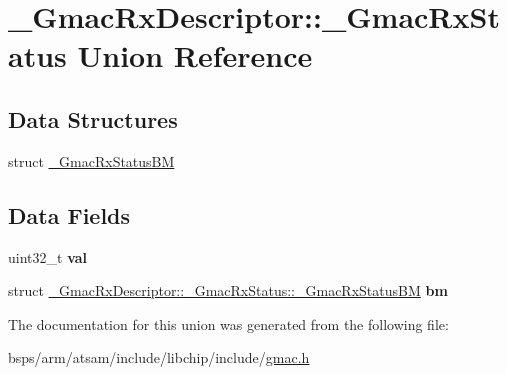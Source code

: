 \hypertarget{union__GmacRxDescriptor_1_1__GmacRxStatus}{}\section{\+\_\+\+Gmac\+Rx\+Descriptor\+::\+\_\+\+Gmac\+Rx\+Status Union Reference}
\label{union__GmacRxDescriptor_1_1__GmacRxStatus}
\subsection*{Data Structures}
\begin{DoxyCompactItemize}
\item 
struct \mbox{\hyperlink{struct__GmacRxDescriptor_1_1__GmacRxStatus_1_1__GmacRxStatusBM}{\+\_\+\+Gmac\+Rx\+Status\+BM}}
\end{DoxyCompactItemize}
\subsection*{Data Fields}
\begin{DoxyCompactItemize}
\item 
uint32\+\_\+t {\bfseries val}
\item 
struct \mbox{\hyperlink{struct__GmacRxDescriptor_1_1__GmacRxStatus_1_1__GmacRxStatusBM}{\+\_\+\+Gmac\+Rx\+Descriptor\+::\+\_\+\+Gmac\+Rx\+Status\+::\+\_\+\+Gmac\+Rx\+Status\+BM}} {\bfseries bm}
\end{DoxyCompactItemize}


The documentation for this union was generated from the following file\+:\begin{DoxyCompactItemize}
\item 
bsps/arm/atsam/include/libchip/include/\mbox{\hyperlink{gmac_8h}{gmac.\+h}}\end{DoxyCompactItemize}
